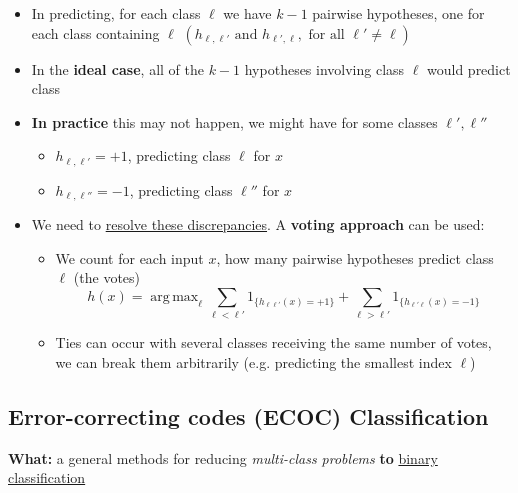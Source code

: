 \documentclass[12pt, a4paper]{article}
\DeclareMathOperator*{\argmax}{arg\,max} %
\begin{document}
\begin{itemize}
  \item In predicting, for each class $\ell$ we have $k - 1$ pairwise hypotheses, one for each class containing $\ell$ $(h_{\ell,\ell'} \text{ and } h_{\ell',\ell}, \text{ for all } \ell' \neq \ell)$
  \item In the \textbf{ideal case}, all of the $k - 1$ hypotheses involving class $\ell$ would predict class
  \item \textbf{In practice} this may not happen, we might have for some classes $\ell', \ell''$
  \begin{itemize}
    \item $h_{\ell,\ell'} = +1$, predicting class $\ell$ for $x$
    \item $h_{\ell,\ell''} = -1$, predicting class $\ell''$ for $x$
  \end{itemize}
  \item We need to \uline{resolve these discrepancies}. A \textbf{voting approach} can be used:
  \begin{itemize}
    \item We count for each input $x$, how many pairwise hypotheses predict class $\ell$ (the votes)
    $$
    h(x) = \argmax_{\ell} \sum_{\ell < \ell'} 1_{\{h_{\ell\ell'}(x)=+1\}} + \sum_{\ell > \ell'} 1_{\{h_{\ell'\ell}(x)=-1\}}
    $$
    \item Ties can occur with several classes receiving the same number of votes, we can break them arbitrarily (e.g. predicting the smallest index $\ell$)
  \end{itemize}
\end{itemize}






\subsection{Error-correcting codes (ECOC) Classification}\label{ecoc-classification}

\textbf{What:} a general methods for reducing \textit{multi-class problems} \textbf{to} \uline{binary classification}
\end{document}
